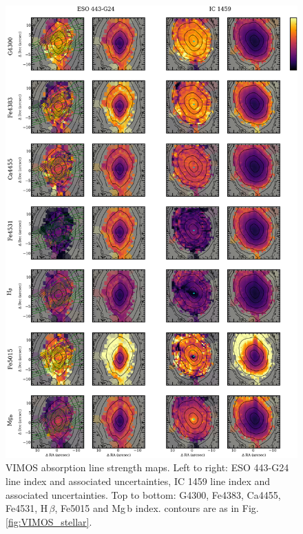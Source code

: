 		\begin{figure}
			\centering
			\includegraphics[height=0.89\textheight]{chapter4/vimos/abs1.png}
			\caption[VIMOS absorption line strength maps]{VIMOS absorption line strength maps. Left to right: ESO 443-G24 line index and associated uncertainties, IC 1459 line index and associated uncertainties. Top to bottom: G4300, Fe4383, Ca4455, Fe4531, H\,$\beta$, Fe5015 and Mg\,b index. contours are as in Fig.\,\ref{fig:VIMOS_stellar}.}%
			\label{fig:VIMOS_absorption}
		\end{figure}
